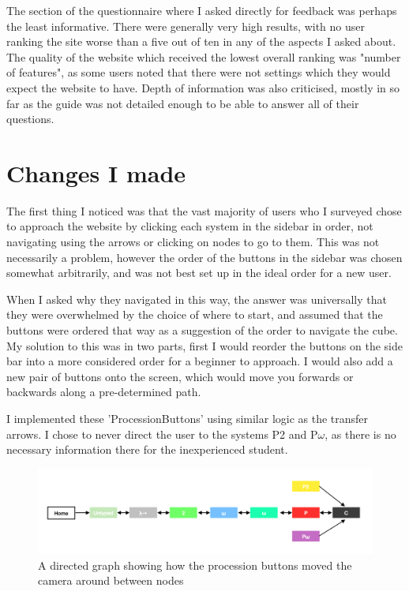 \documentclass{l4proj}
\begin{document}
The section of the questionnaire where I asked directly for feedback was perhaps the least informative.  There were generally very high results, with no user ranking the site worse than a five out of ten in any of the aspects I asked about.  The quality of the website which received the lowest overall ranking was "number of features", as some users noted that there were not settings which they would expect the website to have.  Depth of information was also criticised, mostly in so far as the guide was not detailed enough to be able to answer all of their questions.

\section{Changes I made}

The first thing I noticed was that the vast majority of users who I surveyed chose to approach the website by clicking each system in the sidebar in order, not navigating using the arrows or clicking on nodes to go to them.  This was not necessarily a problem, however the order of the buttons in the sidebar was chosen somewhat arbitrarily, and was not best set up in the ideal order for a new user.

When I asked why they navigated in this way, the answer was universally that they were overwhelmed by the choice of where to start, and assumed that the buttons were ordered that way as a suggestion of the order to navigate the cube.  My solution to this was in two parts, first I would reorder the buttons on the side bar into a more considered order for a beginner to approach.  I would also add a new pair of buttons onto the screen, which would move you forwards or backwards along a pre-determined path.

I implemented these 'ProcessionButtons' using similar logic as the transfer arrows.  I chose to never direct the user to the systems P2 and P\underline{$\omega$}, as there is no necessary information there for the inexperienced student.

\begin{figure}[h!]
    \centering
    \includegraphics[width=1\linewidth]{dissertation/images/arrows_graph.png}
    \caption{A directed graph showing how the procession buttons moved the camera around between nodes}
    \label{fig:enter-label}
\end{figure}    
\end{document}
